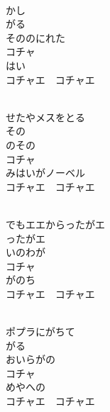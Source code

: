 \documentclass[10pt,b5j]{tarticle} %
\begin{document}
\vspace{1.5em} %
\newcommand{\linespace}{0.5em} %
\newcommand{\blocksize}{0.5\hsize} %
\newcommand{\itemmargin}{6em} %
\begin{enumerate} %
    \setlength{\itemindent}{\itemmargin} %
    \begin{minipage}[c]{\blocksize}
    
        \vspace{\linespace}
        \item~\\
        かし\\
        がる\\
        そののにれた\\
        コチャ\\
        はい\\
        コチャエ　コチャエ
        
        \vspace{\linespace}
        \item~\\
        せたやメスをとる\\
        その\\
        のその\\
        コチャ\\
        みはいがノーベル\\
        コチャエ　コチャエ
        
        \vspace{\linespace}
        \item~\\
        でもエエからったがエ\\
        ったがエ\\
        いのわが\\
        コチャ\\
        がのち\\
        コチャエ　コチャエ
        
        \vspace{\linespace}
        \item~\\
        ポプラにがちて\\
        がる\\
        おいらがの\\
        コチャ\\
        めやへの\\
        コチャエ　コチャエ
    
    \end{minipage}
\end{enumerate} %
\end{document}
